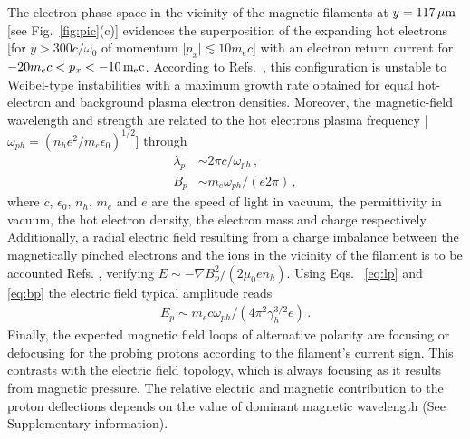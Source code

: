 \documentclass[aps,twocolumn,showpacs,superscriptaddress]{revtex4}
\begin{document}
The electron phase space in the vicinity of the magnetic filaments at $y = 117\,\rm \mu m$ [see Fig.~\ref{fig:pic}(c)] evidences the superposition of the expanding hot electrons [for  $y > 300c/\omega_0$ of momentum $\vert p_x \vert \lesssim 10 m_ec$] with an electron return current for $-20 m_ec < p_x< -10\,\rm m_e c$.
According to Refs.~\cite{POP_Ren_2006, PRL_Gode_2017}, 
this configuration is unstable to Weibel-type instabilities with a maximum growth rate obtained for equal hot-electron and background plasma electron densities. Moreover, the magnetic-field wavelength and strength are related to the hot electrons plasma frequency [$\omega_{ph}=(n_h e^2/m_e \epsilon_0)^{1/2}$] through 
\begin{align}
 \lambda_p &\sim  2\pi c/\omega_{ph} \label{eq:lp}  \, ,\\
 B_p       &\sim m_e \omega_{ph}/(e2\pi) \label{eq:bp} \, , 
\end{align}
where $c$, $\epsilon_0$, $n_h$, $m_e$ and $e$  are the speed of light in vacuum, the permittivity in vacuum, the hot electron density, the electron mass and  charge respectively.
Additionally, a radial electric field resulting from a charge imbalance between the magnetically pinched electrons and the ions in the vicinity of the filament is to be accounted Refs. \cite{POP_Dieckmann_2009, POP_Bret_Gremillet_2010}, verifying $E\sim - \nabla B_p^2/(2 \mu_0e n_h)$. Using Eqs.~ \eqref{eq:lp} and \eqref{eq:bp} the electric field typical amplitude reads
\begin{align} 
E_p\sim m_ec\omega_{ph} /(4\pi^2\gamma_h^{3/2} e) \label{eq:ep} \, .
\end{align}
Finally, the expected magnetic field loops of alternative polarity are focusing or defocusing for the probing protons according to the filament's current sign. This contrasts with the electric field  topology, which  is  always focusing as it results from magnetic pressure. 
The relative electric and magnetic contribution to the proton deflections depends on the value of dominant magnetic wavelength (See Supplementary information). 
\end{document}
